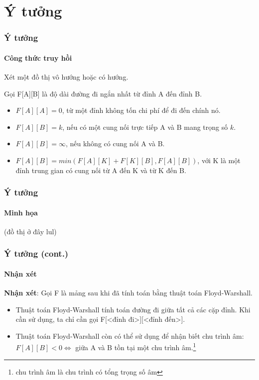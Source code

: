 \documentclass[12pt]{beamer}
\begin{document}
    \section{Ý tưởng}
    \begin{frame}
        \frametitle{Ý tưởng}
        \framesubtitle{Công thức truy hồi}
        Xét một đồ thị vô hướng hoặc có hướng.

        Gọi F[A][B] là độ dài đường đi ngắn nhất từ đỉnh A đến đỉnh B.\pause
        \begin{itemize}
            \item $F[A][A] = 0$, từ một đỉnh không tốn chi phí để đi đến chính nó.\pause
            \item $F[A][B] = k$, nếu có một cung nối trực tiếp A và B mang trọng số $k$.\pause
            \item $F[A][B] = \infty$, nếu không có cung nối A và B.\pause
            \item $F[A][B] = min(F[A][K] + F[K][B], F[A][B])$, với K là một đỉnh trung gian có cung nối từ A đến K và từ K đến B.
        \end{itemize}
    \end{frame}

    \begin{frame}
        \frametitle{Ý tưởng}
        \framesubtitle{Minh họa}

        (đồ thị ở đây lul)
    \end{frame}

    \begin{frame}
        \frametitle{Ý tưởng (cont.)}
        \framesubtitle{Nhận xét}
        \textbf{Nhận xét}: Gọi F là mảng sau khi đã tính toán bằng thuật toán Floyd-Warshall.\pause
        \begin{itemize}
            \item Thuật toán Floyd-Warshall tính toán đường đi giữa tất cả các cặp đỉnh. Khi cần sử dụng, ta chỉ cần gọi F[<đỉnh đi>][<đỉnh đến>].\pause
            \item Thuật toán Floyd-Warshall còn có thể sử dụng để nhận biết chu trình âm: $F[A][B] < 0 \iff $ giữa A và B tồn tại một chu trình âm.\footnote{chu trình âm là chu trình có tổng trọng số âm}\cite{gtlt:book}
        \end{itemize}
    \end{frame}
\end{document}
